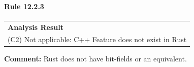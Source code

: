 \paragraph{Rule 12.2.3}
\begin{longtable}{p{13cm}}
\textbf{Analysis Result} \\
(C2) Not applicable: C++ Feature does not exist in Rust \\
\end{longtable}
\textbf{Comment:} Rust does not have bit-fields or an equivalent. \\
